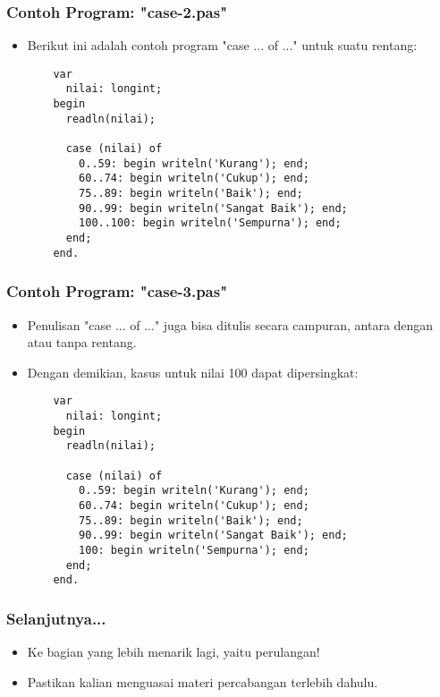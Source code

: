 \begin{frame}[fragile]
\frametitle{Contoh Program: "case-2.pas"}
\begin{itemize}
  \item Berikut ini adalah contoh program "case ... of ..." untuk suatu rentang:
  \begin{lstlisting}
    var
      nilai: longint;
    begin
      readln(nilai);
    
      case (nilai) of
        0..59: begin writeln('Kurang'); end;
        60..74: begin writeln('Cukup'); end;
        75..89: begin writeln('Baik'); end;
        90..99: begin writeln('Sangat Baik'); end;
        100..100: begin writeln('Sempurna'); end;
      end;
    end.
  \end{lstlisting}
\end{itemize}
\end{frame}

\begin{frame}[fragile]
\frametitle{Contoh Program: "case-3.pas"}
\begin{itemize}
  \item Penulisan "case ... of ..." juga bisa ditulis secara campuran, antara dengan atau tanpa rentang.
  \item Dengan demikian, kasus untuk nilai 100 dapat dipersingkat:
  \begin{lstlisting}
    var
      nilai: longint;
    begin
      readln(nilai);
    
      case (nilai) of
        0..59: begin writeln('Kurang'); end;
        60..74: begin writeln('Cukup'); end;
        75..89: begin writeln('Baik'); end;
        90..99: begin writeln('Sangat Baik'); end;
        100: begin writeln('Sempurna'); end;
      end;
    end.
  \end{lstlisting}
\end{itemize}
\end{frame}

\begin{frame}
\frametitle{Selanjutnya...}
\begin{itemize}
  \item Ke bagian yang lebih menarik lagi, yaitu perulangan!
  \item Pastikan kalian menguasai materi percabangan terlebih dahulu.
\end{itemize}
\end{frame}


